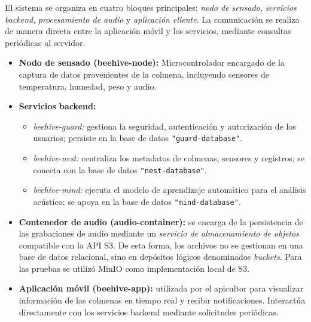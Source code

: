\label{sec:arquitectura_sistema}

El sistema se organiza en cuatro bloques principales: \emph{nodo de sensado}, \emph{servicios backend}, \emph{procesamiento de audio} y \emph{aplicación cliente}. La comunicación se realiza de manera directa entre la aplicación móvil y los servicios, mediante consultas periódicas al servidor.

\begin{itemize}
    \item \textbf{Nodo de sensado (beehive-node):} Microcontrolador encargado de la captura de datos provenientes de la colmena, incluyendo sensores de temperatura, humedad, peso y audio.
    \item \textbf{Servicios backend:}
    \begin{itemize}
        \item \textit{beehive-guard:} gestiona la seguridad, autenticación y autorización de los usuarios; persiste en la base de datos \texttt{"guard-database"}.
        \item \textit{beehive-nest:} centraliza los metadatos de colmenas, sensores y registros; se conecta con la base de datos \texttt{"nest-database"}.
        \item \textit{beehive-mind:} ejecuta el modelo de aprendizaje automático para el análisis acústico; se apoya en la base de datos \texttt{"mind-database"}.
    \end{itemize}
    \item \textbf{Contenedor de audio (audio-container):} 
    se encarga de la persistencia de las grabaciones de audio mediante un 
    \emph{servicio de almacenamiento de objetos} compatible con la API S3. 
    De esta forma, los archivos no se gestionan en una base de datos relacional, 
    sino en depósitos lógicos denominados \emph{buckets}. 
    Para las pruebas se utilizó MinIO como implementación local de S3.
    \item \textbf{Aplicación móvil (beehive-app):} utilizada por el apicultor para visualizar información de las colmenas en tiempo real y recibir notificaciones. Interactúa directamente con los servicios backend mediante solicitudes periódicas.
\end{itemize}

